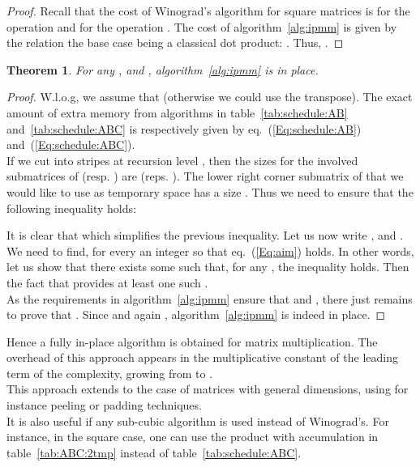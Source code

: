 \documentclass{article}
\newtheorem{thm}{Theorem}
\begin{document}
\begin{proof}
Recall that  the cost of Winograd's algorithm for square matrices is   for the operation  and  for the operation .
The cost  of algorithm~\ref{alg:ipmm} is given by the relation
 the base case
being a classical dot product: .
Thus, .
\end{proof}
\begin{thm}
For any ,  and , algorithm~\ref{alg:ipmm} is in place.
\end{thm}
\begin{proof}
W.l.o.g, we assume that  (otherwise we could use the transpose).
	The exact amount of extra memory from algorithms in table~\ref{tab:schedule:AB} and~\ref{tab:schedule:ABC} is
	respectively given by eq.~(\ref{Eq:schedule:AB}) and~(\ref{Eq:schedule:ABC}).\\ 
If we cut  into  stripes at recursion level , then the sizes for the involved submatrices of  (resp. ) are  (reps. ). 
	The lower right corner submatrix of  that we would like to use as temporary space has a size .
	Thus we need to ensure that the following inequality holds:
	
	It is clear that  which simplifies the previous inequality.
	Let us now write ,  and . We need to find, for every  an integer  so that eq.~(\ref{Eq:aim}) holds. In other words, let us show that there exists some  such that, for any , the inequality  holds.
Then the fact that  provides at least one such .\\
	As the requirements in algorithm~\ref{alg:ipmm} ensure that  and , there just remains to prove that . Since  and  again , algorithm~\ref{alg:ipmm} is indeed in place.
\end{proof}
Hence a fully in-place  algorithm is obtained for matrix
multiplication.
The overhead of this approach appears in the multiplicative constant of
the leading term of the complexity, growing from  to .\\
This approach extends to the case of matrices with general
dimensions, using for instance peeling or padding techniques.\\
It is also useful if any sub-cubic algorithm is used
instead of Winograd's. For instance, in the square case, one can use the product with accumulation in table~\ref{tab:ABC:2tmp} instead of table~\ref{tab:schedule:ABC}.
\end{document}
